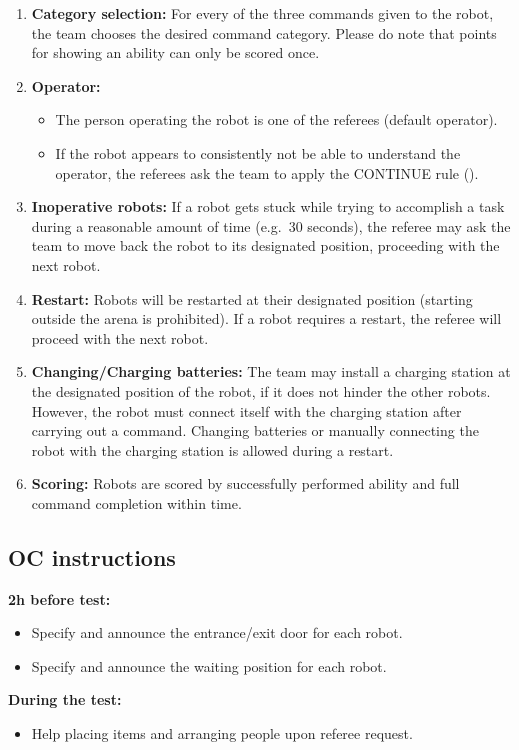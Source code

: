 \begin{enumerate}
	\item \textbf{Category selection:} For every of the three commands given to the robot, the team chooses the desired command category. Please do note that points for showing an ability can only be scored once.\\

	\item \textbf{Operator:}
	\begin{itemize}
		\item The person operating the robot is one of the referees (default operator).
		\item If the robot appears to consistently not be able to understand the operator, the referees ask the team to apply the CONTINUE rule ().
	\end{itemize}

	\item \textbf{Inoperative robots:} If a robot gets stuck while trying to accomplish a task during a reasonable amount of time (e.g.~30 seconds), the referee may ask the team to move back the robot to its designated position, proceeding with the next robot. \\

	\item \textbf{Restart:} Robots will be restarted at their designated position (starting outside the arena is prohibited). If a robot requires a restart, the referee will proceed with the next robot.\\

	\item \textbf{Changing/Charging batteries:} The team may install a charging station at the designated position of the robot, if it does not hinder the other robots. However, the robot must connect itself with the charging station after carrying out a command. Changing batteries or manually connecting the robot with the charging station is allowed during a restart. \\

	\item \textbf{Scoring:} Robots are scored by successfully performed ability and full command completion within time. 
\end{enumerate}

\subsection{OC instructions}
\textbf{2h before test:}
\begin{itemize}
	\item Specify and announce the entrance/exit door for each robot. 
	\item Specify and announce the waiting position for each robot. 
\end{itemize}
\textbf{During the test:}
\begin{itemize}
	\item Help placing items and arranging people upon referee request.
\end{itemize}

